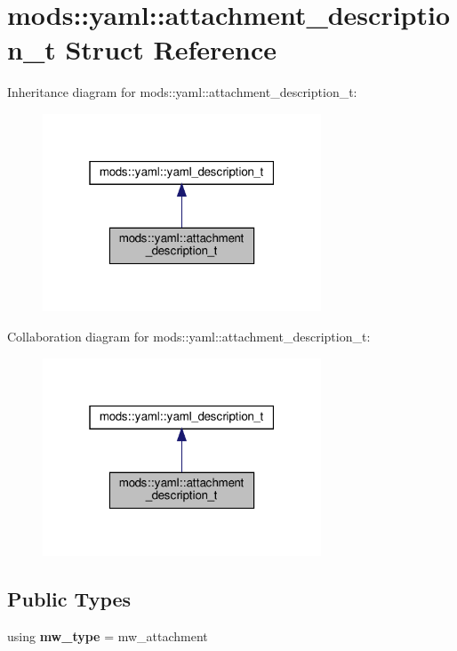 \hypertarget{structmods_1_1yaml_1_1attachment__description__t}{}\section{mods\+:\+:yaml\+:\+:attachment\+\_\+description\+\_\+t Struct Reference}
\label{structmods_1_1yaml_1_1attachment__description__t}


Inheritance diagram for mods\+:\+:yaml\+:\+:attachment\+\_\+description\+\_\+t\+:\nopagebreak
\begin{figure}[H]
\begin{center}
\leavevmode
\includegraphics[width=235pt]{structmods_1_1yaml_1_1attachment__description__t__inherit__graph}
\end{center}
\end{figure}


Collaboration diagram for mods\+:\+:yaml\+:\+:attachment\+\_\+description\+\_\+t\+:\nopagebreak
\begin{figure}[H]
\begin{center}
\leavevmode
\includegraphics[width=235pt]{structmods_1_1yaml_1_1attachment__description__t__coll__graph}
\end{center}
\end{figure}
\subsection*{Public Types}
\begin{DoxyCompactItemize}
\item 
\mbox{\label{structmods_1_1yaml_1_1attachment__description__t_ac1d79e8edb937c62acc8f148f495d77b}} 
using {\bfseries mw\+\_\+type} = mw\+\_\+attachment
\end{DoxyCompactItemize}

